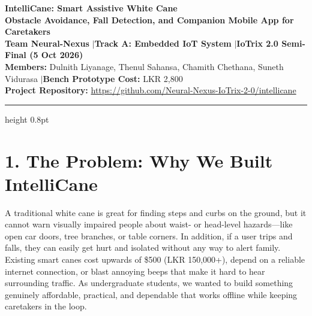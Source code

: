 \documentclass[10pt,a4paper]{article}
\begin{document}
\begin{center}
    {\Large \textbf{\color{primary} IntelliCane: Smart Assistive White Cane}} \\[0.25em]
    {\normalsize \textbf{Obstacle Avoidance, Fall Detection, and Companion Mobile App for Caretakers}} \\[0.3em]
    \footnotesize
    \textbf{Team Neural-Nexus} \quad$|$\quad \textbf{Track A: Embedded IoT System} \quad$|$\quad \textbf{IoTrix 2.0 Semi-Final (5 Oct 2026)} \\
    \textbf{Members:} Dulnith Liyanage, Thenul Sahansa, Chamith Chethana, Suneth Vidurasa \quad$|$\quad \textbf{Bench Prototype Cost:} LKR 2,800 \\
    \textbf{Project Repository:} \url{https://github.com/Neural-Nexus-IoTrix-2-0/intellicane}
\end{center}
\vspace{-0.5em}
\hrule height 0.8pt
\vspace{0.4em}

\section{1. The Problem: Why We Built IntelliCane}
A traditional white cane is great for finding steps and curbs on the ground, but it cannot warn visually impaired people about waist- or head-level hazards---like open car doors, tree branches, or table corners. In addition, if a user trips and falls, they can easily get hurt and isolated without any way to alert family. Existing smart canes cost upwards of \$500 (LKR 150,000+), depend on a reliable internet connection, or blast annoying beeps that make it hard to hear surrounding traffic. As undergraduate students, we wanted to build something genuinely affordable, practical, and dependable that works offline while keeping caretakers in the loop.
\end{document}
